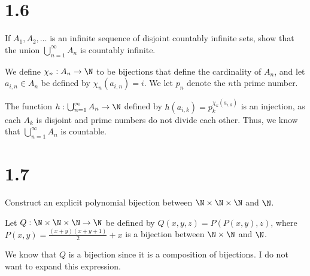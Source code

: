 \documentclass[11pt]{mypackage}
\begin{document}
\section{1.6}%
\begin{problem}
  If $A_1,A_2,\dots$ is an infinite sequence of disjoint countably infinite sets, show that the union $\bigcup_{n=1}^{\infty} A_n$ is countably infinite.
\end{problem}
\begin{solution}
  We define $\chi_n: A_n\rightarrow \N$ to be bijections that define the cardinality of $A_n$, and let $a_{i,n}\in A_n$ be defined by $\chi_n\left(a_{i,n}\right) = i$. We let $p_n$ denote the $n$th prime number.\newline

  The function $h: \bigcup_{n=1}^{\infty}A_n\rightarrow \N$ defined by $h\left(a_{i,k}\right) = p_k^{\chi_k\left(a_{i,k}\right)}$ is an injection, as each $A_k$ is disjoint and prime numbers do not divide each other. Thus, we know that $\bigcup_{n=1}^{\infty}A_n$ is countable.
\end{solution}
%
%
%
\section{1.7}%
\begin{problem}
  Construct an explicit polynomial bijection between $\N\times\N\times\N$ and $\N$.
\end{problem}
\begin{solution}
  Let $Q: \N\times\N\times\N \rightarrow \N$ be defined by $Q(x,y,z) = P\left(P(x,y),z\right)$, where $P(x,y) = \frac{(x+y)(x+y+1)}{2} + x$ is a bijection between $\N\times\N$ and $\N$.\newline

  We know that $Q$ is a bijection since it is a composition of bijections. I do not want to expand this expression.
\end{solution}
\end{document}
